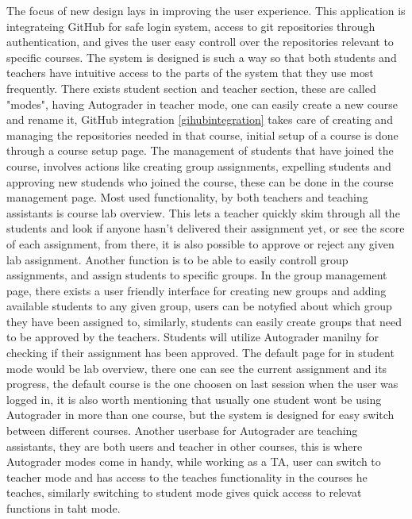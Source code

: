 The focus of new design lays in improving the user experience. This application is integrateing GitHub for safe login system, access to git repositories through authentication, and gives the user easy controll over the repositories relevant to specific courses. The system is designed is such a way so that both students and teachers have intuitive access to the parts of the system that they use most frequently. There exists student section and teacher section, these are called "modes", having Autograder in teacher mode, one can easily create a new course and rename it, GitHub integration \ref{gihubintegration} takes care of creating and managing the repositories needed in that course, initial setup of a course is done through a course setup page. The management of students that have joined the course, involves actions like creating group assignments, expelling students and approving new studends who joined the course, these can be done in the course management page. Most used functionality, by both teachers and teaching assistants is course lab overview. This lets a teacher quickly skim through all the students and look if anyone hasn't delivered their assignment yet, or see the score of each assignment, from there, it is also possible to approve or reject any given lab assignment. Another function is to be able to easily controll group assignments, and assign students to specific groups. In the group management page, there exists a user friendly interface for creating new groups and adding available students to any given group, users can be notyfied about which group they have been assigned to, similarly, students can easily create groups that need to be approved by the teachers. Students will utilize Autograder manilny for checking if their assignment has been approved. The default page for in student mode would be lab overview, there one can see the current assignment and its progress, the default course is the one choosen on last session when the user was logged in, it is also worth mentioning that usually one student wont be using Autograder in more than one course, but the system is designed for easy switch between different courses. Another userbase for Autograder are teaching assistants, they are both users and teacher in other courses, this is where Autograder modes come in handy, while working as a TA, user can switch to teacher mode and has access to the teaches functionality in the courses he teaches, similarly switching to student mode gives quick access to relevat functions in taht mode.
